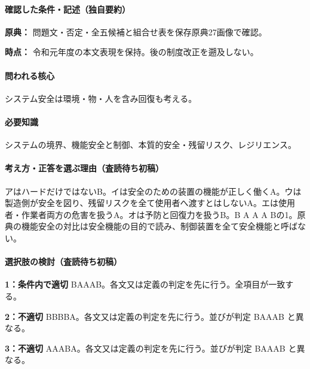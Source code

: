 \paragraph{確認した条件・記述（独自要約）}\mbox{}\par

\noindent\textbf{原典：} 問題文・否定・全五候補と組合せ表を保存原典27画像で確認。\par

\noindent\textbf{時点：} 令和元年度の本文表現を保持。後の制度改正を遡及しない。\par

\paragraph{問われる核心} システム安全は環境・物・人を含み回復も考える。

\paragraph{必要知識} システムの境界、機能安全と制御、本質的安全・残留リスク、レジリエンス。

\paragraph{考え方・正答を選ぶ理由（査読待ち初稿）} アはハードだけではないB。イは安全のための装置の機能が正しく働くA。ウは製造側が安全を図り、残留リスクを全て使用者へ渡すとはしないA。エは使用者・作業者両方の危害を扱うA。オは予防と回復力を扱うB。B A A A Bの1。原典の機能安全の対比は安全機能の目的で読み、制御装置を全て安全機能と呼ばない。

\paragraph{選択肢の検討（査読待ち初稿）}\mbox{}\par

\noindent\textbf{1：条件内で適切} BAAAB。各文又は定義の判定を先に行う。全項目が一致する。\par

\noindent\textbf{2：不適切} BBBBA。各文又は定義の判定を先に行う。並びが判定 BAAAB と異なる。\par

\noindent\textbf{3：不適切} AAABA。各文又は定義の判定を先に行う。並びが判定 BAAAB と異なる。\par

